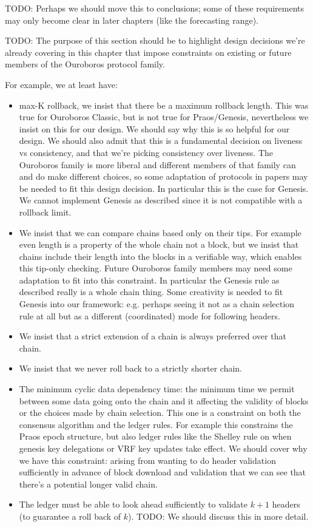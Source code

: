  TODO: Perhaps we should move this to conclusions; some of these
requirements may only become clear in later chapters (like the forecasting
range).

 TODO: The purpose of this section should be to highlight design
decisions we're already covering in this chapter that impose constraints
on existing or future members of the Ouroboros protocol family.

For example, we at least have:
\begin{itemize}
\item max-K rollback, we insist that there be a maximum rollback length. This
was true for Ouroboros Classic, but is not true for Praos/Genesis, nevertheless
we insist on this for our design. We should say why this is so helpful for our
design. We should also admit that this is a fundamental decision on liveness vs
consistency, and that we're picking consistency over liveness. The Ouroboros
family is more liberal and different members of that family can and do make
different choices, so some adaptation of protocols in papers may be needed to
fit this design decision. In particular this is the case for Genesis. We cannot
implement Genesis as described since it is not compatible with a rollback limit.

\item We insist that we can compare chains based only on their tips. For example
even length is a property of the whole chain not a block, but we insist that
chains include their length into the blocks in a verifiable way, which enables
this tip-only checking. Future Ouroboros family members may need some adaptation
to fit into this constraint. In particular the Genesis rule as described really
is a whole chain thing. Some creativity is needed to fit Genesis into our
framework: e.g. perhaps seeing it not as a chain selection rule at all but as a
different (coordinated) mode for following headers.

\item We insist that a strict extension of a chain is always preferred over
that chain.

\item We insist that we never roll back to a strictly shorter chain.

\item The minimum cyclic data dependency time: the minimum time we permit
between some data going onto the chain and it affecting the validity of blocks
or the choices made by chain selection. This one is a constraint on both the
consensus algorithm and the ledger rules. For example this constrains the Praos
epoch structure, but also ledger rules like the Shelley rule on when genesis
key delegations or VRF key updates take effect. We should cover why we have this
constraint: arising from wanting to do header validation sufficiently in advance
of block download and validation that we can see that there's a potential longer
valid chain.

\item The ledger must be able to look ahead sufficiently to validate $k + 1$
headers (to guarantee a roll back of $k$). TODO: We should discuss
this in more detail.
\end{itemize}

